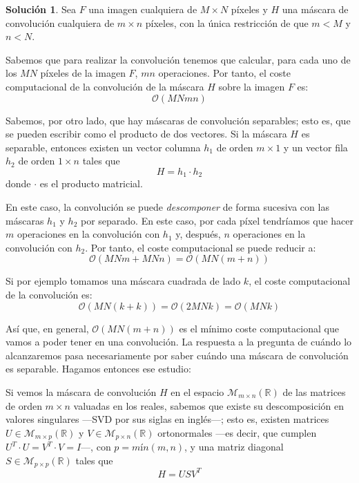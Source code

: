 \documentclass[a4paper, 11pt]{article}
\theoremstyle{definition}
\newtheorem*{solucion}{Solución}
\theoremstyle{theorem}
\begin{document}
  \begin{solucion}
      Sea $F$ una imagen cualquiera de $M \times N$ píxeles y $H$ una máscara de convolución cualquiera de $m \times n$ píxeles, con la única restricción de que $m<M$ y $n<N$.

      Sabemos que para realizar la convolución tenemos que calcular, para cada uno de los $MN$ píxeles de la imagen $F$, $mn$ operaciones. Por tanto, el coste computacional de la convolución de la máscara $H$ sobre la imagen $F$ es:
      \[
      \mathcal{O}(MNmn)
      \]

      Sabemos, por otro lado, que hay máscaras de convolución separables; esto es, que se pueden escribir como el producto de dos vectores. Si la máscara $H$ es separable, entonces existen un vector columna $h_1$ de orden $m \times 1$ y un vector fila $h_2$ de orden $1 \times n$ tales que
      \[
      H = h_1 \cdot h_2
      \]
      donde $\cdot$ es el producto matricial.

      En este caso, la convolución se puede \emph{descomponer} de forma sucesiva con las máscaras $h_1$ y $h_2$ por separado. En este caso, por cada píxel tendríamos que hacer $m$ operaciones en la convolución con $h_1$ y, después, $n$ operaciones en la convolución con $h_2$. Por tanto, el coste computacional se puede reducir a:
      \[
      \mathcal{O}(MNm+MNn) = \mathcal{O}(MN(m+n))
      \]

      Si por ejemplo tomamos una máscara cuadrada de lado $k$, el coste computacional de la convolución es:
      \[
      \mathcal{O}(MN(k+k)) = \mathcal{O}(2MNk) = \mathcal{O}(MNk)
      \]

      Así que, en general, $\mathcal{O}(MN(m+n))$ es el mínimo coste computacional que vamos a poder tener en una convolución. La respuesta a la pregunta de cuándo lo alcanzaremos pasa necesariamente por saber cuándo una máscara de convolución es separable. Hagamos entonces ese estudio:

      Si vemos la máscara de convolución $H$ en el espacio $\mathcal{M}_{m\times n}(\mathbb{R})$ de las matrices de orden $m\times n$ valuadas en los reales, sabemos que existe su descomposición en valores singulares ---SVD por sus siglas en inglés---; esto es, existen matrices $U\in\mathcal{M}_{m\times p}(\mathbb{R})$ y $V\in\mathcal{M}_{p\times n}(\mathbb{R})$ ortonormales ---es decir, que cumplen $U^T\cdot U=V^T\cdot V=I$---, con $p=mín(m,n)$, y una matriz diagonal $S\in\mathcal{M}_{p\times p}(\mathbb{R})$ tales que
      \begin{equation}
          H = USV^T \label{SVD}
      \end{equation}


\end{solucion}
\end{document}
